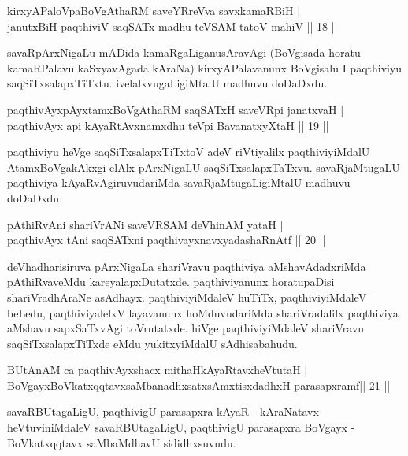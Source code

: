 \begin{shl}
kirxyAPaloVpaBoVgAthaRM saveYRreVva savxkamaRBiH |\\
janutxBiH paqthiviV saqSATx madhu teVSAM tatoV mahiV \hfill || 18 || 
\end{shl}
\begin{artha}
savaRpArxNigaLu mADida kamaRgaLiganusAravAgi (BoVgisada horatu kamaRPalavu kaSxyavAgada kAraNa) kirxyAPalavanunx BoVgisalu I paqthiviyu saqSiTxsalapxTiTxtu. ivelalxvugaLigiMtalU madhuvu doDaDxdu.
\end{artha}
\begin{shl}
paqthivAyx\s pAyxtamxBoVgAthaRM saqSATxH saveVR\s pi janatxvaH |\\
paqthivAyx api kAyaRtAvxnamxdhu teV\s pi BavanatxyXtaH \hfill || 19 ||
\end{shl}
\begin{artha}
paqthiviyu heVge saqSiTxsalapxTiTxtoV adeV riVtiyalilx paqthiviyiMdalU AtamxBoVgakAkxgi elAlx pArxNigaLU saqSiTxsalapxTaTxvu. savaRjaMtugaLU paqthiviya kAyaRvAgiruvudariMda savaRjaMtugaLigiMtalU madhuvu doDaDxdu.
\end{artha}
\begin{shl}
pAthiRvAni shariVrANi saveVRSAM deVhinAM yataH |\\
paqthivAyx tAni saqSATxni paqthivayxnavxyadashaRnAtf \hfill  || 20 || 
\end{shl}
\begin{artha}
deVhadharisiruva pArxNigaLa shariVravu paqthiviya aMshavAdadxriMda pAthiRva\-veMdu kareyalapxDutatxde. paqthiviyanunx horatupaDisi shariVradhAraNe asAdhayx. paqthiviyiMdaleV huTiTx, paqthiviyiMdaleV beLedu,  paqthiviyalelxV layavanunx hoMduvudariMda shariVradalilx paqthiviya aMshavu sapxSaTxvAgi toVrutatxde. hiVge paqthiviyiMdaleV shariVravu saqSiTxsalapxTiTxde eMdu yukitxyiMdalU sAdhisabahudu.  
\end{artha}
\begin{shl}
BUtAnAM ca paqthivAyxshacx mithaHkAyaRtavxheVtutaH |\\
BoVgayxBoVkatxqqtavxsaMbanadhxsatxsAmxtisxdadhxH parasapxramf\hfill  || 21 || 
\end{shl}
\begin{artha}
savaRBUtagaLigU, paqthivigU parasapxra kAyaR - kAraNatavx heVtuviniMdaleV savaRBUtagaLigU, paqthivigU parasapxra BoVgayx - BoVkatxqqtavx saMbaMdhavU sididhxsuvudu.
\end{artha}
